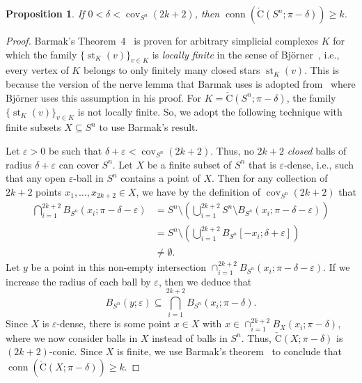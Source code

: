\documentclass[11 pt,a4paper,twoside,reqno]{amsart}
\newtheorem{proposition}[theorem]{Proposition}
\theoremstyle{definition}
\newcommand{\cech}[2]{\mathrm{\check{C}}(#1;#2)}
\DeclareMathOperator{\conn}{conn}
\DeclareMathOperator{\st}{st}
\DeclareMathOperator{\cov}{cov}
\begin{document}
\begin{proposition}
\label{prop:fintoinf}
If $0<\delta<\cov_{S^n}(2k+2)$, then $\conn(\cech{S^n}{\pi-\delta}) \ge k$.
\end{proposition}

\begin{proof}
Barmak’s Theorem~4~\cite[Appendix]{farber2023large} is proven for arbitrary simplicial complexes $K$ for which the family $\{\st_K(v)\}_{v \in K}$ is \emph{locally finite} in the sense of Bj\"{o}rner~\cite{Bjorner1995}, i.e., every vertex of $K$ belongs to only finitely many closed stars $\st_K(v)$.
This is because the version of the nerve lemma that Barmak uses is adopted from~\cite[Theorem 10.6]{Bjorner1995} where Bj\"{o}rner uses this assumption in his proof.
For $K = \cech{S^n}{\pi-\delta}$, the family $\{\st_K(v)\}_{v \in K}$ is not locally finite.
So, we adopt the following technique with finite subsets $X\subseteq S^n$ to use Barmak's result.

Let $\varepsilon>0$ be such that $\delta +\varepsilon<\cov_{S^n}(2k+2)$.
Thus, no $2k+2$ \emph{closed} balls of radius $\delta + \varepsilon$ can cover $S^n$.
Let $X$ be a finite subset of $S^n$ that is $\varepsilon$-dense, i.e., such that any open $\varepsilon$-ball in $S^n$ contains a point of $X$.
Then for any collection of $2k+2$ points $x_1,\ldots,x_{2k+2} \in X$, we have by the definition of $\cov_{S^n}(2k+2)$ that
\begin{align*}
    \bigcap_{i=1}^{2k+2}B_{S^n}(x_i;\pi-\delta-\varepsilon) 
    &= S^n \setminus \left(\bigcup_{i=1}^{2k+2}S^n\setminus B_{S^n}\left(x_i;\pi-\delta-\varepsilon\right)\right) \\
    &= S^n \setminus \left(\bigcup_{i=1}^{2k+2} B_{S^n}\left[-x_i;\delta+\varepsilon\right]\right) \\
    &\ne \emptyset.
\end{align*}
Let $y$ be a point in this non-empty intersection $\cap_{i=1}^{2k+2}B_{S^n}(x_i;\pi-\delta-\varepsilon)$.
If we increase the radius of each ball by $\varepsilon$, then we deduce that
\[
B_{S^n}(y;\varepsilon) \subseteq \bigcap_{i=1}^{2k+2}B_{S^n}(x_i;\pi-\delta).
\]
Since $X$ is $\varepsilon$-dense, there is some point $x \in X$ with 
$x \in \cap_{i=1}^{2k+2}B_{X}(x_i;\pi-\delta)$, {where we now consider balls in $X$ instead of balls in $S^n$.}
Thus, $\cech{X}{\pi-\delta}$ is $(2k+2)$-conic.
Since $X$ is finite, we use Barmak's theorem~\cite{farber2023large} to conclude that $\conn(\cech{X}{\pi-\delta}) \ge k$.


\end{proof}
\end{document}
